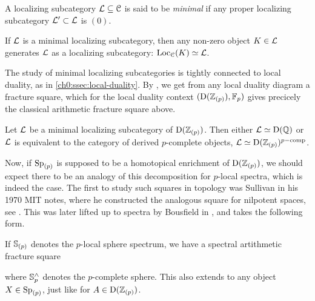 \begin{definition}
    \label{ch0:def:minimal-localizing-subcategory}
    A localizing subcategory $\L\subseteq \C$ is said to be \emph{minimal} if any proper localizing subcategory $\L'\subset \L$ is $(0)$.  
\end{definition}

\begin{remark}
    If $\L$ is a minimal localizing subcategory, then any non-zero object $K\in \L$ generates $\L$ as a localizing subcategory: $\Loc_\C(K)\simeq \L$.
\end{remark}

The study of minimal localizing subcategories is tightly connected to local duality, as in \cref{ch0:ssec:local-duality}. By \cite[2.26]{barthel-heard-valenzuela_2018}, we get from any local duality diagram a fracture square, which for the local duality context $(\Der(\Z_{(p)}), \F_p)$ gives precicely the classical arithmetic fracture square above. 

\begin{proposition}
    Let $\L$ be a minimal localizing subcategory of $\Der(\Z_{(p)})$. Then either $\L \simeq \Der(\Q)$ or $\L$ is equivalent to the category of derived $p$-complete objects, $\L\simeq \Der(\Z_{(p)})^{p-\mathrm{comp}}$.
\end{proposition}

Now, if $\Sp_{(p)}$ is supposed to be a homotopical enrichment of $\Der(\Z_{(p)})$, we should expect there to be an analogy of this decomposition for $p$-local spectra, which is indeed the case. The first to study such squares in topology was Sullivan in his 1970 MIT notes, where he constructed the analogous square for nilpotent spaces, see \cite[3.20]{sullivan_05}. This was later lifted up to spectra by Bousfield in \cite[2.9]{bousfield_1979_localization}, and takes the following form. 

If $\S_{(p)}$ denotes the $p$-local sphere spectrum, we have a spectral artithmetic fracture square

\begin{center}
\end{center}

where $\S_p^\wedge$ denotes the $p$-complete sphere. This also extends to any object $X\in \Sp_{(p)}$, just like for $A\in \Der(\Z_{(p)})$. 

